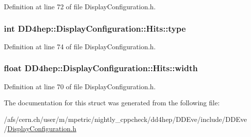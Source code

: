 Definition at line 72 of file DisplayConfiguration.h.\hypertarget{struct_d_d4hep_1_1_display_configuration_1_1_hits_ae126f3863288c51dc2633ba132e97bb0}{
\subsubsection[{type}]{\setlength{\rightskip}{0pt plus 5cm}int {\bf DD4hep::DisplayConfiguration::Hits::type}}}
\label{struct_d_d4hep_1_1_display_configuration_1_1_hits_ae126f3863288c51dc2633ba132e97bb0}


Definition at line 74 of file DisplayConfiguration.h.\hypertarget{struct_d_d4hep_1_1_display_configuration_1_1_hits_abf1d6b1a1ec5689bd11153429affb607}{
\subsubsection[{width}]{\setlength{\rightskip}{0pt plus 5cm}float {\bf DD4hep::DisplayConfiguration::Hits::width}}}
\label{struct_d_d4hep_1_1_display_configuration_1_1_hits_abf1d6b1a1ec5689bd11153429affb607}


Definition at line 70 of file DisplayConfiguration.h.

The documentation for this struct was generated from the following file:\begin{DoxyCompactItemize}
\item 
/afs/cern.ch/user/m/mpetric/nightly\_\-cppcheck/dd4hep/DDEve/include/DDEve/\hyperlink{_display_configuration_8h}{DisplayConfiguration.h}\end{DoxyCompactItemize}
